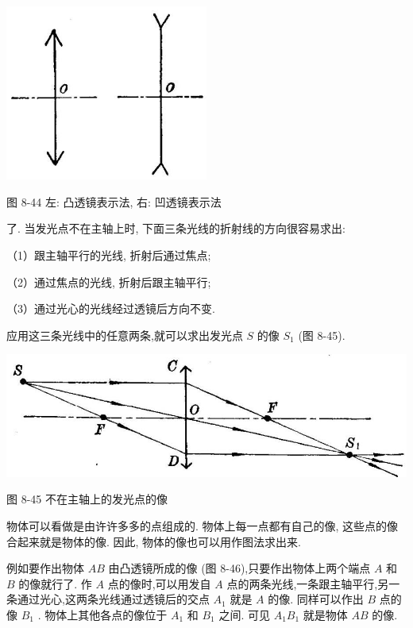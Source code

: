 \documentclass[10pt]{article}
\begin{document}
\begin{center}
\includegraphics[max width=0.5\textwidth]{images/01913056-1f15-74d8-9184-9aab52c9d66b_278_534388.jpg}
\end{center}

图 8-44 左: 凸透镜表示法, 右: 凹透镜表示法

了. 当发光点不在主轴上时, 下面三条光线的折射线的方向很容易求出:

（1）跟主轴平行的光线, 折射后通过焦点;

（2）通过焦点的光线, 折射后跟主轴平行;

（3）通过光心的光线经过透镜后方向不变.

应用这三条光线中的任意两条,就可以求出发光点 \(S\) 的像 \({S}_{1}\) (图 8-45).

\begin{center}
\includegraphics[max width=1.0\textwidth]{images/01913056-1f15-74d8-9184-9aab52c9d66b_278_657476.jpg}
\end{center}

图 8-45 不在主轴上的发光点的像

物体可以看做是由许许多多的点组成的. 物体上每一点都有自己的像, 这些点的像合起来就是物体的像. 因此, 物体的像也可以用作图法求出来.

例如要作出物体 \({AB}\) 由凸透镜所成的像 (图 8-46),只要作出物体上两个端点 \(A\) 和 \(B\) 的像就行了. 作 \(A\) 点的像时,可以用发自 \(A\) 点的两条光线,一条跟主轴平行,另一条通过光心,这两条光线通过透镜后的交点 \({A}_{1}\) 就是 \(A\) 的像. 同样可以作出 \(B\) 点的像 \({B}_{1}\) . 物体上其他各点的像位于 \({A}_{1}\) 和 \({B}_{1}\) 之间. 可见 \({A}_{1}{B}_{1}\) 就是物体 \({AB}\) 的像.
\end{document}
